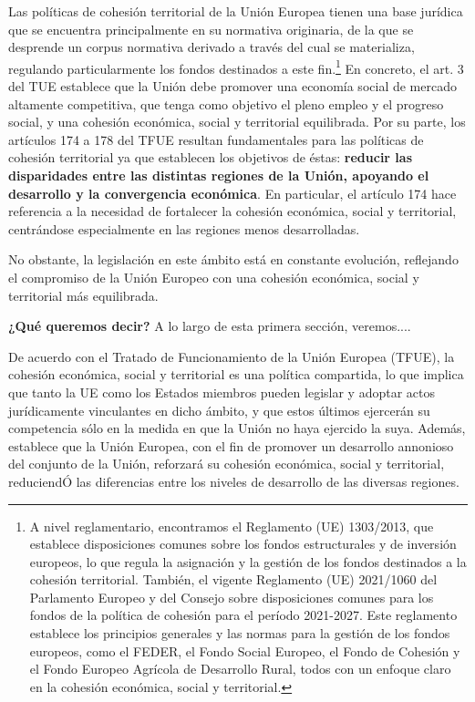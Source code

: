 \documentclass[10pt,a4paper]{article}
\begin{document}
Las políticas de cohesión territorial de la Unión Europea tienen una base jurídica que se encuentra principalmente en su normativa originaria, de la que se desprende un corpus normativa derivado a través del cual se materializa, regulando particularmente los fondos destinados a este fin.\footnote{%
    A nivel reglamentario, encontramos el Reglamento (UE) 1303/2013, que establece disposiciones comunes sobre los fondos estructurales y de inversión europeos, lo que regula la asignación y la gestión de los fondos destinados a la cohesión territorial. También, el vigente Reglamento (UE) 2021/1060 del Parlamento Europeo y del Consejo sobre disposiciones comunes para los fondos de la política de cohesión para el período 2021-2027. Este reglamento establece los principios generales y las normas para la gestión de los fondos europeos, como el FEDER, el Fondo Social Europeo, el Fondo de Cohesión y el Fondo Europeo Agrícola de Desarrollo Rural, todos con un enfoque claro en la cohesión económica, social y territorial.
} En concreto, el art. 3 del TUE establece que la Unión debe promover una economía social de mercado altamente competitiva, que tenga como objetivo el pleno empleo y el progreso social, y una cohesión económica, social y territorial equilibrada. Por su parte, los artículos 174 a 178 del TFUE resultan fundamentales para las políticas de cohesión territorial ya que establecen los objetivos de éstas: \textbf{reducir las disparidades entre las distintas regiones de la Unión, apoyando el desarrollo y la convergencia económica}. En particular, el artículo 174 hace referencia a la necesidad de fortalecer la cohesión económica, social y territorial, centrándose especialmente en las regiones menos desarrolladas.

No obstante, la legislación en este ámbito está en constante evolución, reflejando el compromiso de la Unión Europeo con una cohesión económica, social y territorial más equilibrada.

\textbf{¿Qué queremos decir?} A lo largo de esta primera sección, veremos....

De acuerdo con el Tratado de Funcionamiento de la Unión Europea (TFUE), la cohesión económica, social y territorial es una política compartida, lo que implica que tanto la UE como los Estados miembros pueden legislar y adoptar actos jurídicamente vinculantes en dicho ámbito, y que estos últimos ejercerán su competencia sólo en la medida en que la Unión no haya ejercido la suya. Además, establece que la Unión Europea, con el fin de promover un desarrollo annonioso del conjunto de la Unión, reforzará su cohesión económica, social y territorial, reduciendÓ las diferencias entre los niveles de desarrollo de las diversas regiones.
\end{document}
